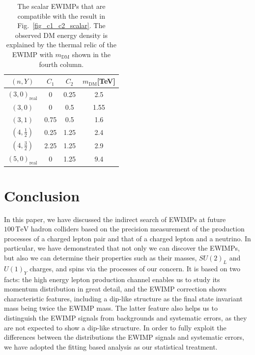 \documentclass[12pt, a4paper]{article}
\begin{document}
\begin{table}[t]
\centering
\begin{tabular}{|c|ccc|}
\hline
$(n, Y)$           & $C_1$ & $C_2$ & $m_\text{DM}$[TeV] \\ \hline\hline
$(3,0)_\text{real}$  &    0  &  0.25  & 2.5 \cite{Farina:2013mla}             \\
$(3,          0)$  &    0  & 0.5   & 1.55 \cite{DelNobile:2015bqo}              \\
$(3,          1)$  & 0.75  & 0.5   & 1.6 \cite{Farina:2013mla}               \\
$(4,\frac{1}{2})$  & 0.25  & 1.25  & 2.4 \cite{Farina:2013mla}             \\
$(4,\frac{3}{2})$  & 2.25  & 1.25  & 2.9 \cite{Farina:2013mla}             \\
$(5,0)_\text{real}$  &    0  &  1.25  & 9.4 \cite{Farina:2013mla}          \\
\hline
\end{tabular}
\caption{The scalar EWIMPs that are compatible with the result in Fig.~\ref{fig_c1_c2_scalar}. The observed DM energy density is explained by the
thermal relic of the EWIMP with $m_{\text{DM}}$ shown in the fourth column.}
\label{tab:minimalDM-for-950scalar-section}
\end{table}


\section{Conclusion}
\label{seq:conclusion}

In this paper, we have discussed the indirect search of EWIMPs at future
$100\,\mathrm{TeV}$ hadron colliders based on the precision measurement
of the production processes of a charged lepton pair and that of a
charged lepton and a neutrino.  In particular, we have demonstrated that
not only we can discover the EWIMPs, but also we can determine their
properties such as their masses, $SU(2)_L$ and $U(1)_Y$ charges, and
spins via the processes of our concern.  It is based on two facts: the
high energy lepton production channel enables us to study its momentum
distribution in great detail, and the EWIMP correction shows
characteristic features, including a dip-like structure as the final
state invariant mass being twice the EWIMP mass.  The latter feature
also helps us to distinguish the EWIMP signals from backgrounds and
systematic errors, as they are not expected to show a dip-like
structure.  In order to fully exploit the differences between the
distributions the EWIMP signals and systematic errors, we have adopted
the fitting based analysis as our statistical treatment.
\end{document}
